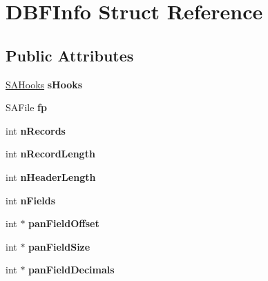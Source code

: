 \hypertarget{structDBFInfo}{\section{D\-B\-F\-Info Struct Reference}
\label{structDBFInfo}
}
\subsection*{Public Attributes}
\begin{DoxyCompactItemize}
\item 
\hypertarget{structDBFInfo_ab4b02e078b66cd298c03d631feca5764}{\hyperlink{structSAHooks}{S\-A\-Hooks} {\bfseries s\-Hooks}}\label{structDBFInfo_ab4b02e078b66cd298c03d631feca5764}

\item 
\hypertarget{structDBFInfo_aa355e48c5a8ac45ae6c565742aacbd26}{S\-A\-File {\bfseries fp}}\label{structDBFInfo_aa355e48c5a8ac45ae6c565742aacbd26}

\item 
\hypertarget{structDBFInfo_abc4144f7f8dffddedccef882e90b59b4}{int {\bfseries n\-Records}}\label{structDBFInfo_abc4144f7f8dffddedccef882e90b59b4}

\item 
\hypertarget{structDBFInfo_a320ac41fd33e2aaa76023704ac519ad0}{int {\bfseries n\-Record\-Length}}\label{structDBFInfo_a320ac41fd33e2aaa76023704ac519ad0}

\item 
\hypertarget{structDBFInfo_a81906c8f76f63ab454241838f15e1407}{int {\bfseries n\-Header\-Length}}\label{structDBFInfo_a81906c8f76f63ab454241838f15e1407}

\item 
\hypertarget{structDBFInfo_a7708f22eeeae500aada4d66b3e7e9347}{int {\bfseries n\-Fields}}\label{structDBFInfo_a7708f22eeeae500aada4d66b3e7e9347}

\item 
\hypertarget{structDBFInfo_a463973c64803d9dff580a7720dd6756e}{int $\ast$ {\bfseries pan\-Field\-Offset}}\label{structDBFInfo_a463973c64803d9dff580a7720dd6756e}

\item 
\hypertarget{structDBFInfo_a89e669da05da8a033bbe23d7bc6fd508}{int $\ast$ {\bfseries pan\-Field\-Size}}\label{structDBFInfo_a89e669da05da8a033bbe23d7bc6fd508}

\item 
\hypertarget{structDBFInfo_a65678210b77b377ef11f837b5f1b5570}{int $\ast$ {\bfseries pan\-Field\-Decimals}}\label{structDBFInfo_a65678210b77b377ef11f837b5f1b5570}


\end{DoxyCompactItemize}
